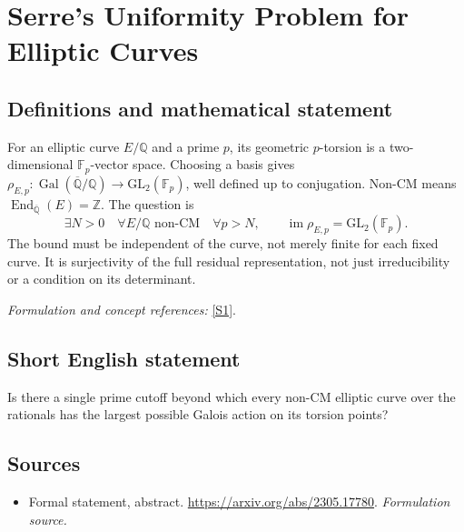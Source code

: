 \documentclass[11pt]{article}
\begin{document}
\section*{\texorpdfstring{Serre's Uniformity Problem for Elliptic Curves}{Serre's Uniformity Problem for Elliptic Curves}}\label{statement}
\subsection{Definitions and mathematical statement}
For an elliptic curve $E/{\mathbb{Q}}$ and a prime $p$, its geometric $p$-torsion is a two-dimensional ${\mathbb{F}}_p$-vector space. Choosing a basis gives
$\rho_{E,p}:\operatorname{Gal}(\overline{{\mathbb{Q}}}/{\mathbb{Q}})\to\mathrm{GL}_2({\mathbb{F}}_p)$, well defined up to conjugation. Non-CM means $\operatorname{End}_{\overline{{\mathbb{Q}}}}(E)={\mathbb{Z}}$. The question is
\[
 \exists N>0\quad\forall E/{\mathbb{Q}}\text{ non-CM}\quad\forall p>N,
 \qquad\operatorname{im}\rho_{E,p}=\mathrm{GL}_2({\mathbb{F}}_p).
\]
The bound must be independent of the curve, not merely finite for each fixed curve. It is surjectivity of the full residual representation, not just irreducibility or a condition on its determinant.
\par\smallskip\textit{Formulation and concept references:} \href{https://arxiv.org/abs/2305.17780}{[S1]}.

\subsection{Short English statement}
Is there a single prime cutoff beyond which every non-CM elliptic curve over the rationals has the largest possible Galois action on its torsion points?
\subsection{Sources}
\begin{itemize}
\item[S1]Formal statement, abstract.
\url{https://arxiv.org/abs/2305.17780}.
\textit{Formulation source.}
\end{itemize}
\end{document}
